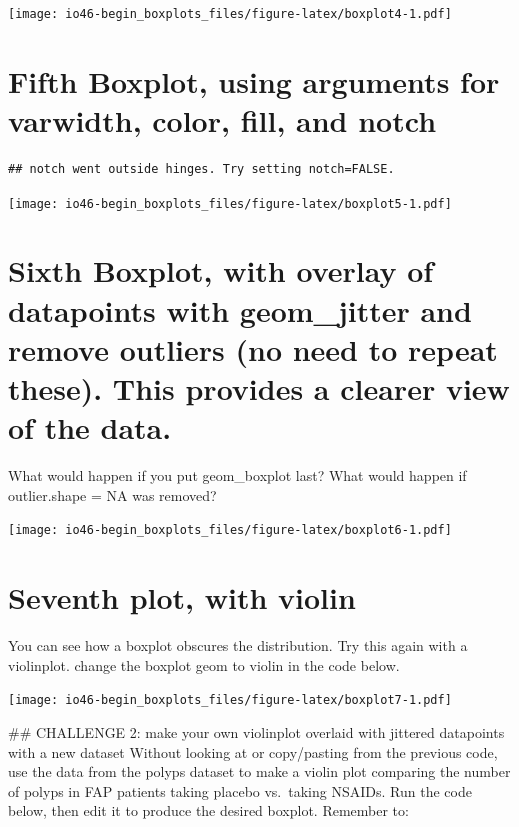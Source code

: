 \documentclass[
]{book}
\begin{document}
\texttt{[image: io46-begin\_boxplots\_files/figure-latex/boxplot4-1.pdf]}

\hypertarget{fifth-boxplot-using-arguments-for-varwidth-color-fill-and-notch}{%
\section{Fifth Boxplot, using arguments for varwidth, color, fill, and notch}\label{fifth-boxplot-using-arguments-for-varwidth-color-fill-and-notch}}

\begin{verbatim}
## notch went outside hinges. Try setting notch=FALSE.
\end{verbatim}

\texttt{[image: io46-begin\_boxplots\_files/figure-latex/boxplot5-1.pdf]}

\hypertarget{sixth-boxplot-with-overlay-of-datapoints-with-geom_jitter-and-remove-outliers-no-need-to-repeat-these.-this-provides-a-clearer-view-of-the-data.}{%
\section{Sixth Boxplot, with overlay of datapoints with geom\_jitter and remove outliers (no need to repeat these). This provides a clearer view of the data.}\label{sixth-boxplot-with-overlay-of-datapoints-with-geom_jitter-and-remove-outliers-no-need-to-repeat-these.-this-provides-a-clearer-view-of-the-data.}}

What would happen if you put geom\_boxplot last?
What would happen if outlier.shape = NA was removed?

\texttt{[image: io46-begin\_boxplots\_files/figure-latex/boxplot6-1.pdf]}

\hypertarget{seventh-plot-with-violin}{%
\section{Seventh plot, with violin}\label{seventh-plot-with-violin}}

You can see how a boxplot obscures the distribution. Try this again with a violinplot. change the boxplot geom to violin in the code below.

\texttt{[image: io46-begin\_boxplots\_files/figure-latex/boxplot7-1.pdf]}

\#\# CHALLENGE 2: make your own violinplot overlaid with jittered datapoints with a new dataset
Without looking at or copy/pasting from the previous code,
use the data from the polyps dataset to make a violin plot comparing the number of polyps in FAP patients taking placebo vs.~taking NSAIDs.
Run the code below, then edit it to produce the desired boxplot.
Remember to:
\end{document}
